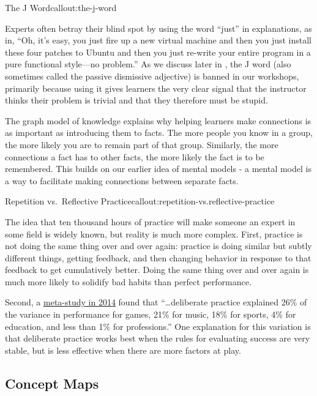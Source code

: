 \begin{callout}{The J Word}{callout:the-j-word}

Experts often betray their blind spot by using the word ``just'' in
explanations, as in, ``Oh, it's easy, you just fire up a new virtual
machine and then you just install these four patches to Ubuntu and then
you just re-write your entire program in a pure functional style---no
problem.'' As we discuss later in ,
the J word (also sometimes called the passive dismissive
adjective) is banned in our workshops, primarily because using it gives
learners the very clear signal that the instructor thinks their problem
is trivial and that they therefore must be stupid.
\end{callout}

The graph model of knowledge explains why helping learners make
connections is as important as introducing them to facts. The more
people you know in a group, the more likely you are to remain part of
that group. Similarly, the more connections a fact has to other facts,
the more likely the fact is to be remembered. This builds on our earlier
idea of mental models - a mental model is a way to facilitate making
connections between separate facts.

\begin{callout}{Repetition vs.~Reflective Practice}{callout:repetition-vs.reflective-practice}

The idea that ten thousand hours of practice will make someone an expert
in some field is widely known, but reality is much more complex. First,
practice is not doing the same thing over and over again: practice is
doing similar but subtly different things, getting feedback, and then
changing behavior in response to that feedback to get cumulatively
better. Doing the same thing over and over again is much more likely to
solidify bad habits than perfect performance.

Second, a \href{http://pss.sagepub.com/content/25/8/1608}{meta-study in
2014} found that ``\ldots{}deliberate practice explained 26\% of the
variance in performance for games, 21\% for music, 18\% for sports, 4\%
for education, and less than 1\% for professions.'' One explanation for
this variation is that deliberate practice works best when the rules for
evaluating success are very stable, but is less effective when there are
more factors at play.
\end{callout}

\subsection{Concept Maps}\label{concept-maps}

